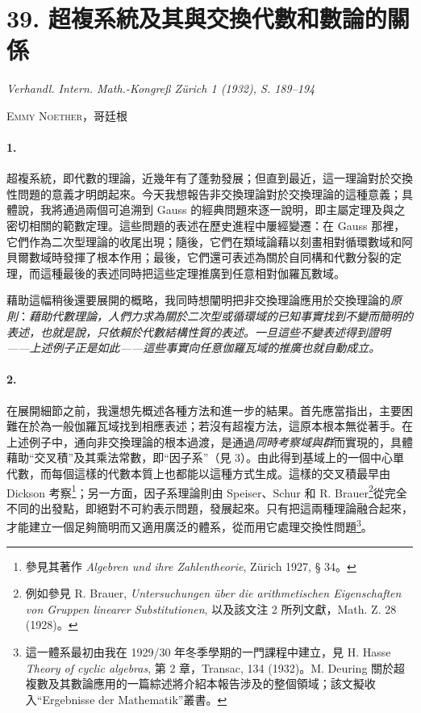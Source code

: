 \documentclass[11pt]{article}
\begin{document}
\section*{39. 超複系統及其與交換代數和數論的關係}

\begin{center}
\emph{Verhandl. Intern. Math.-Kongreß Zürich 1 (1932), S. 189--194}
\end{center}

\begin{center}
\textsc{Emmy Noether，哥廷根}
\end{center}

\paragraph{1.}
超複系統，即代數的理論，近幾年有了蓬勃發展；但直到最近，這一理論對於交換性問題的意義才明朗起來。今天我想報告非交換理論對於交換理論的這種意義；具體說，我將通過兩個可追溯到 Gauss 的經典問題來逐一說明，即主屬定理及與之密切相關的範數定理。這些問題的表述在歷史進程中屢經變遷：在 Gauss 那裡，它們作為二次型理論的收尾出現；隨後，它們在類域論藉以刻畫相對循環數域和阿貝爾數域時發揮了根本作用；最後，它們還可表述為關於自同構和代數分裂的定理，而這種最後的表述同時把這些定理推廣到任意相對伽羅瓦數域。

藉助這幅稍後還要展開的概略，我同時想闡明把非交換理論應用於交換理論的\emph{原則}：\emph{藉助代數理論，人們力求為關於二次型或循環域的已知事實找到不變而簡明的表述，也就是說，只依賴於代數結構性質的表述。一旦這些不變表述得到證明——上述例子正是如此——這些事實向任意伽羅瓦域的推廣也就自動成立。}

\paragraph{2.}
在展開細節之前，我還想先概述各種方法和進一步的結果。首先應當指出，主要困難在於為一般伽羅瓦域找到相應表述；若沒有超複方法，這原本根本無從著手。在上述例子中，通向非交換理論的根本過渡，是通過\emph{同時考察域與群}而實現的，具體藉助“交叉積”及其乘法常數，即“因子系”（見 3）。由此得到基域上的一個中心單代數，而每個這樣的代數本質上也都能以這種方式生成。這樣的交叉積最早由 Dickson 考察\footnote{參見其著作 \emph{Algebren und ihre Zahlentheorie}, Zürich 1927, § 34。}；另一方面，因子系理論則由 Speiser、Schur 和 R. Brauer\footnote{例如參見 R. Brauer, \emph{Untersuchungen über die arithmetischen Eigenschaften von Gruppen linearer Substitutionen}, 以及該文注 2 所列文獻，Math. Z. 28 (1928)。}從完全不同的出發點，即絕對不可約表示問題，發展起來。只有把這兩種理論融合起來，才能建立一個足夠簡明而又適用廣泛的體系，從而用它處理交換性問題\footnote{這一體系最初由我在 1929/30 年冬季學期的一門課程中建立，見 H. Hasse \emph{Theory of cyclic algebras}, 第 2 章，Transac, 134 (1932)。M. Deuring 關於超複數及其數論應用的一篇綜述將介紹本報告涉及的整個領域；該文擬收入“Ergebnisse der Mathematik”叢書。}。
\end{document}
